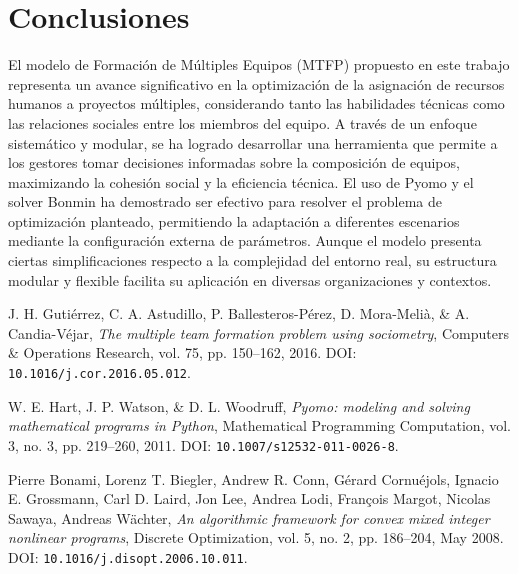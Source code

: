 \documentclass[conference]{IEEEtran}
\begin{document}
\section{Conclusiones}
El modelo de Formación de Múltiples Equipos (MTFP) propuesto en este trabajo representa un avance significativo en la optimización de la asignación de recursos humanos a proyectos múltiples, considerando tanto las habilidades técnicas como las relaciones sociales entre los miembros del equipo. A través de un enfoque sistemático y modular, se ha logrado desarrollar una herramienta que permite a los gestores tomar decisiones informadas sobre la composición de equipos, maximizando la cohesión social y la eficiencia técnica.
El uso de Pyomo y el solver Bonmin ha demostrado ser efectivo para resolver el problema de optimización planteado, permitiendo la adaptación a diferentes escenarios mediante la configuración externa de parámetros. Aunque el modelo presenta ciertas simplificaciones respecto a la complejidad del entorno real, su estructura modular y flexible facilita su aplicación en diversas organizaciones y contextos.


\begin{thebibliography}{00}

    J. H. Gutiérrez, C. A. Astudillo, P. Ballesteros-Pérez, D. Mora-Melià, \& A. Candia-Véjar,
    \textit{The multiple team formation problem using sociometry},
    Computers \& Operations Research, vol. 75, pp. 150--162, 2016. DOI: \texttt{10.1016/j.cor.2016.05.012}.

    W. E. Hart, J. P. Watson, \& D. L. Woodruff,
    \textit{Pyomo: modeling and solving mathematical programs in Python},
    Mathematical Programming Computation, vol. 3, no. 3, pp. 219--260, 2011. DOI: \texttt{10.1007/s12532-011-0026-8}.


    Pierre Bonami, Lorenz T. Biegler, Andrew R. Conn, Gérard Cornuéjols, Ignacio E. Grossmann, Carl D. Laird, Jon Lee, Andrea Lodi, François Margot, Nicolas Sawaya, Andreas Wächter,
    \textit{An algorithmic framework for convex mixed integer nonlinear programs},
    Discrete Optimization, vol. 5, no. 2, pp. 186--204, May 2008. DOI: \texttt{10.1016/j.disopt.2006.10.011}.

\end{thebibliography}
\end{document}

